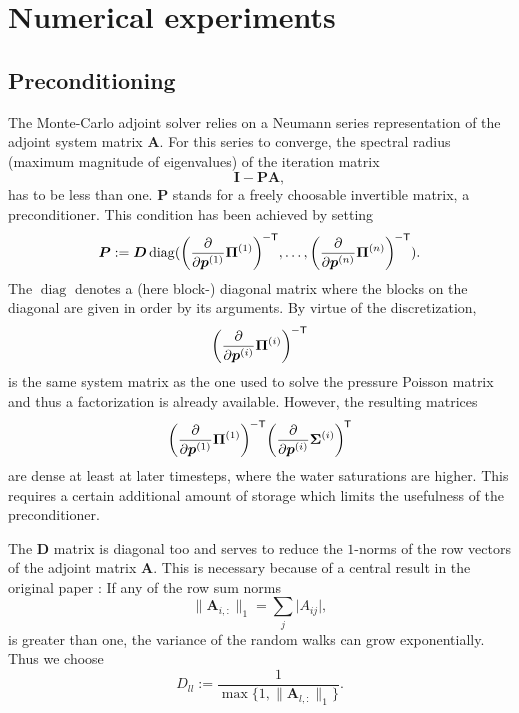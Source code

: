 \documentclass[twoside]{IEEEtran}
\newcommand*{\pdiff}[2]{\ensuremath{\frac{\partial}{\partial{#2}}{#1}}}
\renewcommand*{\vec}[1]{\ensuremath{{\bm{#1}}}}
\newcommand*{\mat}[1]{\vec{#1}}
\newcommand*{\transpose}[1]{{#1}^{\mkern-1.5mu\mathsf{T}}}
\newcommand*{\transposeinvert}[1]{{#1}^{\mkern-1.5mu\mathsf{-T}}}
\begin{document}
\section{Numerical experiments}
\label{experiments}
\subsection{Preconditioning}
The Monte-Carlo adjoint solver relies on a Neumann series representation of the adjoint system matrix $\mat{A}$.
For this series to converge, the spectral radius (maximum magnitude of eigenvalues) of the iteration matrix
\begin{equation}
\mat{I} - \mat{PA},
\end{equation}
has to be less than one. $\mat{P}$ stands for a freely choosable invertible matrix, a preconditioner.
This condition has been achieved by setting
\begin{equation}
\label{preconditioner}
\mat{P} := \mat{D}\operatorname{diag}(\transposeinvert{\left(\pdiff{\vec{\Pi}^{(1)}}{\vec{p}^{(1)}}\right)}, \ldots, \transposeinvert{\left(\pdiff{\vec{\Pi}^{(n)}}{\vec{p}^{(n)}}\right)}).
\end{equation}
The $\operatorname{diag}$ denotes a (here block-) diagonal matrix where the blocks on the diagonal are given in order by its arguments.
By virtue of the discretization,
\begin{equation}
\transposeinvert{\left(\pdiff{\vec{\Pi}^{(i)}}{\vec{p}^{(i)}}\right)}
\end{equation}
is the same system matrix as the one used to solve the pressure Poisson matrix and thus a  factorization is already available.
However, the resulting matrices 
\begin{equation}
\transposeinvert{\left(\pdiff{\vec{\Pi}^{(1)}}{\vec{p}^{(1)}}\right)}\transpose{\left(\pdiff{\vec{\Sigma}^{(i)}}{\vec{p}^{(i)}}\right)}
\end{equation}
are dense at least at later timesteps, where the water saturations are higher.
This requires a certain additional amount of storage which limits the usefulness of the preconditioner.

The $\mat{D}$ matrix is diagonal too and serves to reduce the $1$-norms of the row vectors of the adjoint matrix $\mat{A}$.
This is necessary because of a central result in the original paper \cite{unsteady}:
If any of the row sum norms 
\begin{equation}
\lVert{\mat{A}_{i, :}}\rVert_1 = \sum_{j} \lvert A_{ij} \rvert,
\end{equation}
is greater than one, the variance of the random walks can grow exponentially.
Thus we choose
\begin{equation}
D_{ll} := \frac{1}{\max\{1, \lVert{\mat{A}_{l, :}}\rVert_1\}}.
\end{equation}
\end{document}
